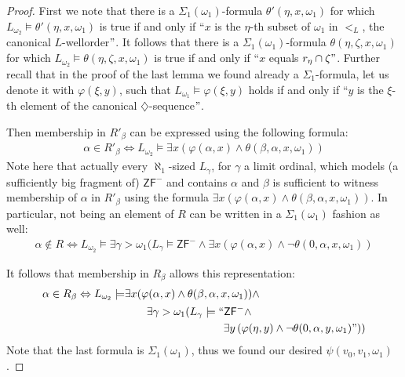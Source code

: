 \documentclass[a4paper,12pt]{article}
\newcommand{\ZFP}{\mathsf{ZF}^-}
\begin{document}
\begin{proof}
First we note that there is a $\Sigma_1(\omega_1)$-formula $\theta'(\eta, x,\omega_1)$ for which 
$L_{\omega_2} \models \theta'(\eta,x,\omega_1)$ is true if and only if ``$x$ is the $\eta$-th subset of $\omega_1$ in $<_L$, the canonical $L$-wellorder$"$. It follows that there is a $\Sigma_1(\omega_1)$-formula $\theta(\eta,\zeta,x,\omega_1)$ for which $L_{\omega_2} \models \theta(\eta, \zeta,x,\omega_1)$ is true if and only if ``$x$ equals ${r}_{\eta} \cap \zeta"$. Further recall that in the proof of the last lemma we found already a $\Sigma_1$-formula, let us denote it with $\varphi(\xi,y)$, such that $L_{\omega_1} \models \varphi(\xi,y)$ holds if and only if ``$y$ is the $\xi$-th element of the canonical $\diamondsuit$-sequence$"$.

Then membership in $R'_{\beta}$ can be expressed using the following formula:
\begin{align*}
\alpha \in R'_{\beta} \Leftrightarrow L_{\omega_2} \models   \exists x( \varphi(\alpha,x) \land \theta(\beta, \alpha,x,\omega_1))
\end{align*}
Note here that actually every $\aleph_1$-sized $L_{\gamma}$, for $\gamma$ a limit ordinal, which models (a sufficiently big fragment of) $\ZFP$ and contains $\alpha$ and $\beta$ is sufficient to witness membership of $\alpha$ in $R'_{\beta}$ using the formula $\exists x( \varphi(\alpha,x) \land \theta(\beta, \alpha,x,\omega_1))$. In particular, not being an element of $R$ can be written in a $\Sigma_1(\omega_1)$ fashion as well:
\begin{align*}
\alpha \notin R \Leftrightarrow L_{\omega_2} \models \exists \gamma >\omega_1 (L_{\gamma} \models  \ZFP \land \exists x( \varphi(\alpha,x) \land \lnot \theta(0, \alpha,x,\omega_1))
\end{align*}

It follows that membership in $R_{\beta}$ allows this representation:
\begin{align*}
\alpha \in R_{\beta} \Leftrightarrow L_{\omega_2} \models &  \exists x( \varphi(\alpha,x) \land \theta(\beta, \alpha,x,\omega_1)) \land \\&
\qquad \exists \gamma > \omega_1( L_{\gamma} \models ``\ZFP \land \ \\& \qquad \qquad \qquad \qquad \quad
 \exists y \, (\varphi(\eta, y) \land \lnot \theta (0,\alpha,y,\omega_1)" ))
\end{align*}
Note that the last formula is $\Sigma_1(\omega_1)$, thus we found our desired $\psi(v_0,v_1,\omega_1)$.
\end{proof}
\end{document}

